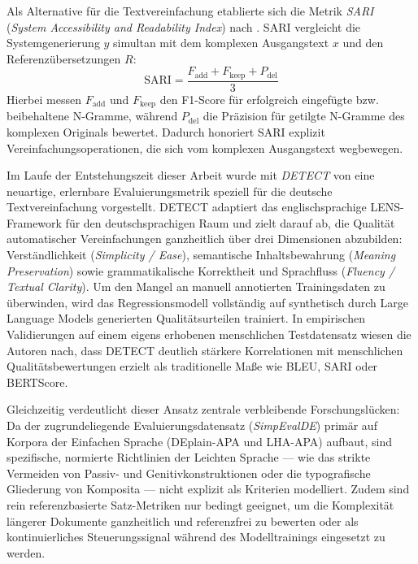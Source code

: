 Als Alternative für die Textvereinfachung etablierte sich die Metrik \textit{SARI} (\textit{System Accessibility and Readability Index}) nach \citet{xu2016optimizing}. SARI vergleicht die Systemgenerierung $y$ simultan mit dem komplexen Ausgangstext $x$ und den Referenzübersetzungen $R$:
\begin{equation}
    \text{SARI} = \frac{F_{\text{add}} + F_{\text{keep}} + P_{\text{del}}}{3}
\end{equation}
Hierbei messen $F_{\text{add}}$ und $F_{\text{keep}}$ den F1-Score für erfolgreich eingefügte bzw. beibehaltene N-Gramme, während $P_{\text{del}}$ die Präzision für getilgte N-Gramme des komplexen Originals bewertet. Dadurch honoriert SARI explizit Vereinfachungsoperationen, die sich vom komplexen Ausgangstext wegbewegen.

Im Laufe der Entstehungszeit dieser Arbeit wurde mit \textit{DETECT} von \citet{korobeynikova2024detect} eine neuartige, erlernbare Evaluierungsmetrik speziell für die deutsche Textvereinfachung vorgestellt. DETECT adaptiert das englischsprachige LENS-Framework für den deutschsprachigen Raum und zielt darauf ab, die Qualität automatischer Vereinfachungen ganzheitlich über drei Dimensionen abzubilden: Verständlichkeit (\textit{Simplicity / Ease}), semantische Inhaltsbewahrung (\textit{Meaning Preservation}) sowie grammatikalische Korrektheit und Sprachfluss (\textit{Fluency / Textual Clarity}). Um den Mangel an manuell annotierten Trainingsdaten zu überwinden, wird das Regressionsmodell vollständig auf synthetisch durch Large Language Models generierten Qualitätsurteilen trainiert. In empirischen Validierungen auf einem eigens erhobenen menschlichen Testdatensatz wiesen die Autoren nach, dass DETECT deutlich stärkere Korrelationen mit menschlichen Qualitätsbewertungen erzielt als traditionelle Maße wie BLEU, SARI oder BERTScore.

Gleichzeitig verdeutlicht dieser Ansatz zentrale verbleibende Forschungslücken: Da der zugrundeliegende Evaluierungsdatensatz (\textit{SimpEvalDE}) primär auf Korpora der Einfachen Sprache (DEplain-APA und LHA-APA) aufbaut, sind spezifische, normierte Richtlinien der Leichten Sprache — wie das strikte Vermeiden von Passiv- und Genitivkonstruktionen oder die typografische Gliederung von Komposita — nicht explizit als Kriterien modelliert. Zudem sind rein referenzbasierte Satz-Metriken nur bedingt geeignet, um die Komplexität längerer Dokumente ganzheitlich und referenzfrei zu bewerten oder als kontinuierliches Steuerungssignal während des Modelltrainings eingesetzt zu werden.

